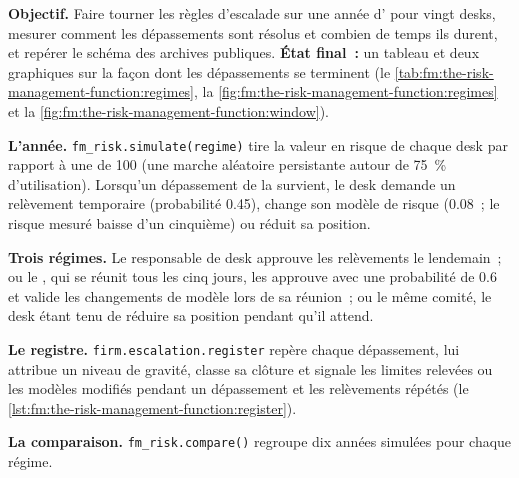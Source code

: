 \begin{tutorial}
\textbf{Objectif.} Faire tourner les règles d'escalade sur une année d' pour vingt desks, mesurer comment les dépassements sont résolus et combien de temps ils durent,
et repérer le schéma des archives publiques. \textbf{État final~:} un tableau et deux graphiques sur la façon dont les dépassements se terminent (le \cref{tab:fm:the-risk-management-function:regimes},
la \cref{fig:fm:the-risk-management-function:regimes} et la \cref{fig:fm:the-risk-management-function:window}).
\begin{tutsteps}
\item \textbf{L'année.} \texttt{fm\_risk.simulate(regime)} tire la valeur en risque de chaque desk par rapport à une  de 100 (une marche aléatoire persistante
autour de 75~\% d'utilisation). Lorsqu'un dépassement de la  survient, le desk demande un relèvement temporaire (probabilité 0.45), change son modèle de risque (0.08~; le
risque mesuré baisse d'un cinquième) ou réduit sa position.
\item \textbf{Trois régimes.} Le responsable de desk approuve les relèvements le lendemain~; ou le , qui se réunit tous les cinq jours, les approuve avec
une probabilité de 0.6 et valide les changements de modèle lors de sa réunion~; ou le même comité, le desk étant tenu de réduire sa position pendant qu'il attend.
\item \textbf{Le registre.} \texttt{firm.escalation.register} repère chaque dépassement, lui attribue un niveau de gravité, classe sa clôture et signale les limites relevées ou
les modèles modifiés pendant un dépassement et les relèvements répétés (le \cref{lst:fm:the-risk-management-function:register}).
\item \textbf{La comparaison.} \texttt{fm\_risk.compare()} regroupe dix années simulées pour chaque régime.
\end{tutsteps}
\end{tutorial}

\label{lst:fm:the-risk-management-function:register}

